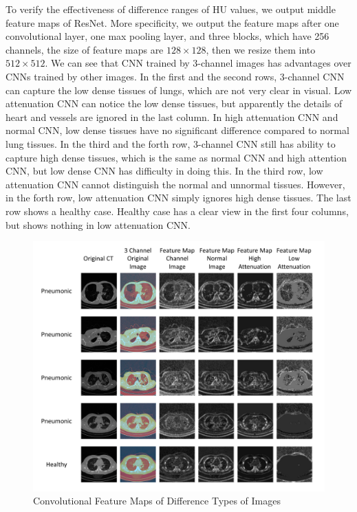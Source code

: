 \documentclass[runningheads]{llncs}
\begin{document}
To verify the effectiveness of difference ranges of HU values, we output middle feature maps of ResNet. More specificity, we output the feature maps after one convolutional layer, one max pooling layer, and three blocks, which have 256 channels, the size of feature maps are $128 \times 128$, then we resize them into $512 \times 512$. We can see that CNN trained by 3-channel images has advantages over CNNs trained by other images. In the first and the second rows, 3-channel CNN can capture the low dense tissues of lungs, which are not very clear in visual. Low attenuation CNN can notice the low dense tissues, but apparently the details of heart and vessels are ignored in the last column. In high attenuation CNN and normal CNN, low dense tissues have no significant difference compared to normal lung tissues.
In the third and the forth row, 3-channel CNN still has ability to capture high dense tissues, which is the same as normal CNN and high attention CNN, but low dense CNN has difficulty in doing this. In the third row, low attenuation CNN cannot distinguish the normal and unnormal tissues. However, in the forth row, low attenuation CNN simply ignores high dense tissues. The last row shows a healthy case. Healthy case has a clear view in the first four columns, but shows nothing in low attenuation CNN.

\begin{figure}[htb]
    \centerline{\includegraphics[width=150mm]{show.pdf}}
    \vspace{-0cm}
    \caption{Convolutional Feature Maps of Difference Types of Images}
    \vspace{-0cm}
    \label{show}
    \end{figure}
\end{document}
